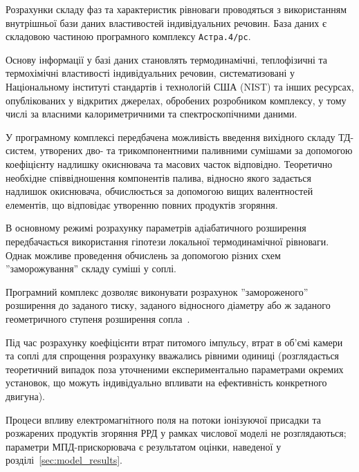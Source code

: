 Розрахунки складу фаз та характеристик рівноваги проводяться з використанням внутрішньої бази даних властивостей індивідуальних речовин. База даних є складовою частиною програмного комплексу \texttt{Астра.4/рс}.

Основу інформації у базі даних становлять термодинамічні, теплофізичні та термохімічні властивості індивідуальних речовин, систематизовані у Національному інституті стандартів і технологій США (NIST) та інших ресурсах, опублікованих у відкритих джерелах, обробених розробником комплексу, у тому числі за власними калориметричними та спектроскопічними даними.

У програмному комплексі передбачена можливість введення вихідного складу ТД-систем, утворених дво- та трикомпонентними паливними сумішами за допомогою коефіцієнту надлишку окиснювача та масових часток відповідно. Теоретично необхідне співвідношення компонентів палива, відносно якого задається надлишок окиснювача, обчислюється за допомогою вищих валентностей елементів, що відповідає утворенню повних продуктів згоряння.

В основному режимі розрахунку параметрів адіабатичного розширення передбачається використання гіпотези локальної термодинамічної рівноваги. Однак можливе проведення обчислень за допомогою різних схем ''заморожування'' складу суміші у соплі.

Програмний комплекс дозволяє виконувати розрахунок ''замороженого'' розширення до заданого тиску, заданого відносного діаметру або ж заданого геометричного ступеня розширення сопла~\cite{Astra}.

Під час розрахунку коефіцієнти втрат питомого імпульсу, втрат в об'ємі камери та соплі для спрощення розрахунку вважались рівними одиниці (розглядається теоретичний випадок поза уточненими експериментально параметрами окремих установок, що можуть індивідуально впливати на ефективність конкретного двигуна).

Процеси впливу електромагнітного поля на потоки іонізуючої присадки та розжарених продуктів згоряння РРД у рамках числової моделі не розглядаються; параметри МПД-прискорювача є результатом оцінки, наведеної у розділі~\ref{sec:model_results}.


